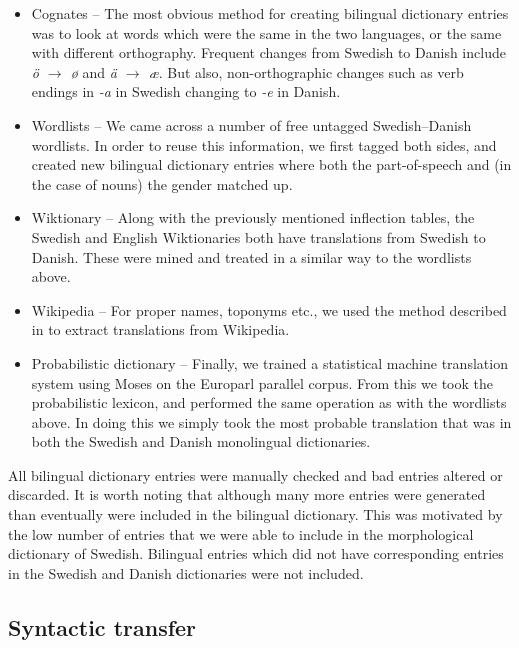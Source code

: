 \documentclass[11pt]{article}
\begin{document}
\begin{itemize} 
  \item Cognates -- The most obvious method for creating bilingual dictionary entries
     was to look at words which were the same in the two languages, or the same with
     different orthography. Frequent changes from Swedish to Danish include \emph{ö $\rightarrow$ ø}
     and \emph{ä $\rightarrow$ æ}. But also, non-orthographic changes such as verb endings
     in \emph{-a} in Swedish changing to \emph{-e} in Danish.
  \item Wordlists -- We came across a number of free untagged Swedish--Danish wordlists. In order
     to reuse this information, we first tagged both sides, and created new bilingual
     dictionary entries where both the part-of-speech and (in the case of nouns) the gender
     matched up. 
  \item Wiktionary -- Along with the previously mentioned inflection tables, the Swedish and 
     English Wiktionaries both have translations from Swedish to Danish. These were mined and 
     treated in a similar way to the wordlists above.
  \item Wikipedia -- For proper names, toponyms etc., we used the method described in \cite{tyers2008}
     to extract translations from Wikipedia.
  \item Probabilistic dictionary -- Finally, we trained a statistical machine translation system
     using Moses \citep{Koehn2007} on the Europarl \citep{Koehn2005} parallel corpus. From this we took
     the probabilistic lexicon, and performed the same operation as with the wordlists above. In doing
     this we simply took the most probable translation that was in both the Swedish and Danish 
     monolingual dictionaries.
\end{itemize}

All bilingual dictionary entries were manually checked and bad entries altered or discarded. It is worth 
noting that although many more entries were generated than eventually were included in the bilingual 
dictionary. This was motivated by the low number of entries that we were able to include in the morphological
dictionary of Swedish. Bilingual entries which did not have corresponding entries in the Swedish and 
Danish dictionaries were not included.

\subsection{Syntactic transfer}
\end{document}
